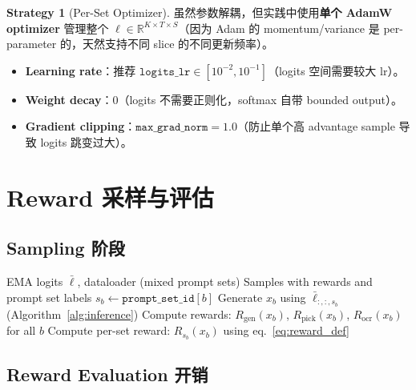 \documentclass[11pt,a4paper]{article}
\newcommand{\R}{\mathbb{R}}
\newcommand{\reward}{R}
\theoremstyle{definition}
\newtheorem{strategy}{Strategy}
\begin{document}
\begin{strategy}[Per-Set Optimizer]
虽然参数解耦，但实践中使用\textbf{单个 AdamW optimizer} 管理整个 $\ell \in \R^{K \times T \times S}$（因为 Adam 的 momentum/variance 是 per-parameter 的，天然支持不同 slice 的不同更新频率）。

\begin{itemize}[leftmargin=1.5em]
\item \textbf{Learning rate}：推荐 $\texttt{logits\_lr} \in [10^{-2}, 10^{-1}]$（logits 空间需要较大 lr）。
\item \textbf{Weight decay}：$0$（logits 不需要正则化，softmax 自带 bounded output）。
\item \textbf{Gradient clipping}：$\texttt{max\_grad\_norm} = 1.0$（防止单个高 advantage sample 导致 logits 跳变过大）。
\end{itemize}
\end{strategy}

\section{Reward 采样与评估}
\label{sec:reward_eval}

\subsection{Sampling 阶段}

\begin{algorithm}[H]
\caption{Per-Set MoF Sampling}
\label{alg:sampling}
\begin{algorithmic}[1]
\Require EMA logits $\bar{\ell}$, dataloader (mixed prompt sets)
\Ensure Samples with rewards and prompt set labels
        \State $s_b \gets \texttt{prompt\_set\_id}[b]$
        \State Generate $x_b$ using $\bar{\ell}_{:,:,s_b}$ (Algorithm~\ref{alg:inference})
    \EndFor
    \State Compute rewards: $R_{\mathrm{gen}}(x_b)$, $R_{\mathrm{pick}}(x_b)$, $R_{\mathrm{ocr}}(x_b)$ for all $b$
    \State Compute per-set reward: $\reward_{s_b}(x_b)$ using eq.~\eqref{eq:reward_def}
\EndFor
\end{algorithmic}
\end{algorithm}

\subsection{Reward Evaluation 开销}
\end{document}
